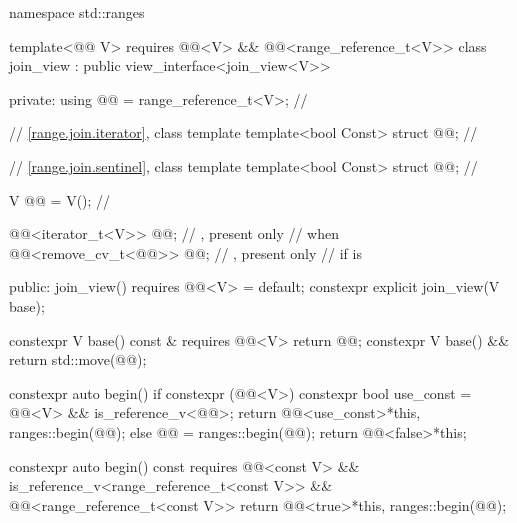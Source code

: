 %
%
%
%
\begin{codeblock}
namespace std::ranges {
  template<@@ V>
    requires @@<V> && @@<range_reference_t<V>>
  class join_view : public view_interface<join_view<V>> {
  private:
    using @@ = range_reference_t<V>;                  // \expos

    // \ref{range.join.iterator}, class template 
    template<bool Const>
      struct @@;                                      // \expos

    // \ref{range.join.sentinel}, class template 
    template<bool Const>
      struct @@;                                      // \expos

    V @@ = V();                                          // \expos

    @@<iterator_t<V>> @@;            // \expos, present only
                                                            // when 
    @@<remove_cv_t<@@>> @@;    // \expos, present only
                                                            // if  is 

  public:
    join_view() requires @@<V> = default;
    constexpr explicit join_view(V base);

    constexpr V base() const & requires @@<V> { return @@; }
    constexpr V base() && { return std::move(@@); }

    constexpr auto begin() {
      if constexpr (@@<V>) {
        constexpr bool use_const = @@<V> &&
                                   is_reference_v<@@>;
        return @@<use_const>{*this, ranges::begin(@@)};
      } else {
        @@ = ranges::begin(@@);
        return @@<false>{*this};
      }
    }

    constexpr auto begin() const
      requires @@<const V> &&
               is_reference_v<range_reference_t<const V>> &&
               @@<range_reference_t<const V>>
    { return @@<true>{*this, ranges::begin(@@)}; }

}}
\end{codeblock}
